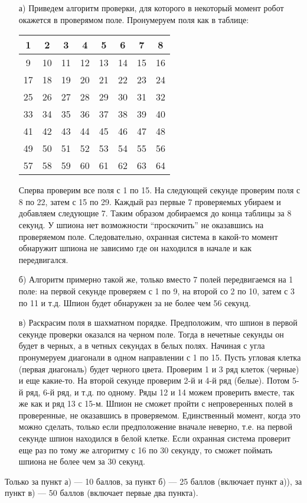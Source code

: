 \solutionSection
\begin{enumerate}
    \item [а)] Приведем алгоритм проверки, для которого в некоторый момент робот окажется в проверямом поле. Пронумеруем поля как в таблице:
    \begin{center}
    \begin{tabular}{|c|c|c|c|c|c|c|c|}\hline
     {1} &  {2} &  {3} &  {4} &  {5} &  {6} &  {7} &  {8}\\\hline
     {9} &  {10} &  {11} &  {12} &  {13} &  {14} &  {15} &  {16}\\\hline
     {17} &  {18} &  {19} &  {20} &  {21} &  {22} &  {23} &  {24}\\\hline
     {25} &  {26} &  {27} &  {28} &  {29} &  {30} &  {31} &  {32}\\\hline
     {33} &  {34} &  {35} &  {36} &  {37} &  {38} &  {39} &  {40}\\\hline
     {41} &  {42} &  {43} &  {44} &  {45} &  {46} &  {47} &  {48}\\\hline
     {49} &  {50} &  {51} &  {52} &  {53} &  {54} &  {55} &  {56}\\\hline
     {57} &  {58} &  {59} &  {60} &  {61} &  {62} &  {63} &  {64}\\\hline
    \end{tabular}
    \end{center}
    
    
    Сперва проверим все поля с 1 по 15. На следующей секунде проверим поля с 8 по 22, затем с 15 по 29. Каждый раз первые 7 проверяемых убираем и добавляем следующие 7. Таким образом добираемся до конца таблицы за 8 секунд. У шпиона нет возможности ``проскочить'' не оказавшись на проверяемом поле. Следовательно, охранная система в какой-то момент обнаружит шпиона не зависимо где он находился в начале и как передвигался.
    
    \item [б)] Алгоритм примерно такой же, только вместо 7 полей передвигаемся на 1 поле: на первой секунде проверяем с 1 по 9, на второй со 2 по 10, затем с 3 по 11 и т.д. Шпион будет обнаружен за не более чем 56 секунд.
    
    \item [в)] Раскрасим поля в шахматном порядке. Предположим, что шпион в первой секунде проверки оказался на черном поле. Тогда в нечетные секунды он будет в черных, а в четных секундах в белых полях. Начиная с угла пронумеруем диагонали в одном направлении с 1 по 15. Пусть угловая клетка (первая диагональ) будет черного цвета. Проверим 1 и 3 ряд клеток (черные) и еще какие-то. На второй секунде проверим 2-й и 4-й ряд (белые). Потом 5-й ряд, 6-й ряд, и т.д. по одному. Ряды 12 и 14 можем проверить вместе, так же как и ряд 13 с 15-м. Шпион не сможет пройти с непроверенных полей в проверенные, не оказавшись в проверяемом. Единственный момент, когда это можно сделать, только если предположение вначале неверно, т.е. на первой секунде шпион находился в белой клетке. Если охранная система проверит еще раз по тому же алгоритму с 16 по 30 секунду, то сможет поймать шпиона не более чем за 30 секунд.
\end{enumerate}

\additionalCriteria 
Только за пункт а) --- 10 баллов, за пункт б) --- 25 баллов (включает пункт а)), за пункт в) --- 50 баллов (включает первые два пункта).

